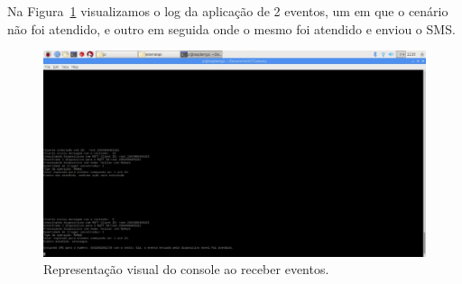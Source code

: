 Na Figura~\ref{fig:eventoConsole} visualizamos o log da aplicação de 2 eventos, um em que o cenário não foi atendido, e outro em seguida onde o mesmo foi atendido e enviou o SMS.
\begin{figure}[h!]
	\begin{center}
		\includegraphics[width=1.085\textwidth]{./img/eventoAtendidoNaoAtendidoConsole}
		\caption{Representação visual do console ao receber eventos.}
		\label{fig:eventoConsole}
	\end{center}
\end{figure}

